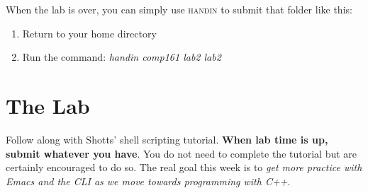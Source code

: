 \documentclass[]{tufte-handout}
\begin{document}
When the lab is over, you can simply use \textsc{handin} to submit that folder like this:
\begin{enumerate}
\item Return to your home directory
\item Run the command: \textit{handin comp161 lab2 lab2}
\end{enumerate}

\section{The Lab}

Follow along with Shotts' shell scripting tutorial. \textbf{When lab time is up, submit whatever you have}.  You do not need to complete the tutorial but are certainly encouraged to do so. The real goal this week is to \textit{get more practice with Emacs and the CLI as we move towards programming with C++}. 
\end{document}
